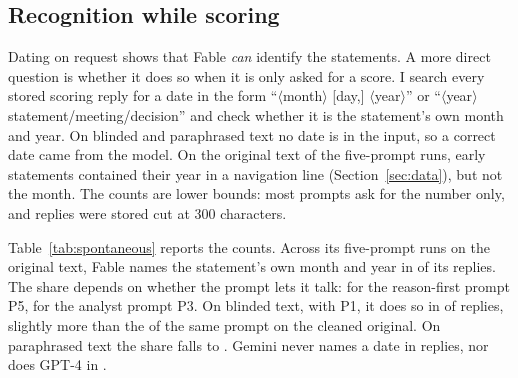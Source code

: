 \subsection{Recognition while scoring}

Dating on request shows that Fable \emph{can} identify the statements. A more direct question is whether
it does so when it is only asked for a score. I search every stored scoring reply for a date in the form
``$\langle$month$\rangle$ [day,] $\langle$year$\rangle$'' or ``$\langle$year$\rangle$
statement/meeting/decision'' and check whether it is the statement's own month and year. On blinded and
paraphrased text no date is in the input, so a correct date came from the model. On the original text of
the five-prompt runs,  early statements contained their year in a navigation line
(Section~\ref{sec:data}), but not the month. The counts are lower bounds: most prompts ask for the number
only, and replies were stored cut at 300 characters.

\begin{table}[t]
\centering
\caption{Scoring replies that name the statement's date, unprompted}\label{tab:spontaneous}
\footnotesize
\setlength{\tabcolsep}{4pt}

\end{table}

Table~\ref{tab:spontaneous} reports the counts. Across its five-prompt runs on the original text, Fable
names the statement's own month and year in  of its replies. The share
depends on whether the prompt lets it talk:  for the reason-first prompt P5,
 for the analyst prompt P3. On blinded text, with P1, it does so in
 of replies, slightly more than the  of the same
prompt on the cleaned original. On paraphrased text the share falls to .
Gemini never names a date in  replies, nor does GPT-4 in
.

\begin{table}[t]
\centering
\caption{Excerpts from Fable's scoring replies}\label{tab:quotes}
\footnotesize

\end{table}

